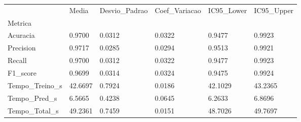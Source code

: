 \begin{tabular}{llllll}
\toprule
 & Media & Desvio_Padrao & Coef_Variacao & IC95_Lower & IC95_Upper \\
Metrica &  &  &  &  &  \\
\midrule
Acuracia & 0.9700 & 0.0312 & 0.0322 & 0.9477 & 0.9923 \\
Precision & 0.9717 & 0.0285 & 0.0294 & 0.9513 & 0.9921 \\
Recall & 0.9700 & 0.0312 & 0.0322 & 0.9477 & 0.9923 \\
F1_score & 0.9699 & 0.0314 & 0.0324 & 0.9475 & 0.9924 \\
Tempo_Treino_s & 42.6697 & 0.7924 & 0.0186 & 42.1029 & 43.2365 \\
Tempo_Pred_s & 6.5665 & 0.4238 & 0.0645 & 6.2633 & 6.8696 \\
Tempo_Total_s & 49.2361 & 0.7459 & 0.0151 & 48.7026 & 49.7697 \\
\bottomrule
\end{tabular}
